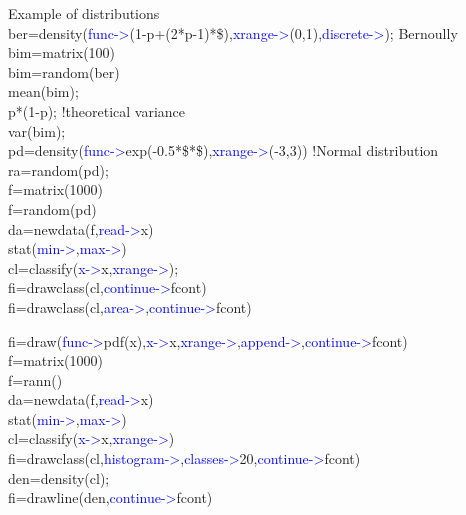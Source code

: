 \begin{example}[densityex]Example of distributions\\
\label{densityex}
ber=\textcolor{VioletRed}{density}(\textcolor{blue}{func->}(1-p+(2*p-1)*\$),\textcolor{blue}{xrange->}(0,1),\textcolor{blue}{discrete->}); Bernoully\\
bim=\textcolor{VioletRed}{matrix}(100)\\
bim=\textcolor{VioletRed}{random}(ber)\\
\textcolor{VioletRed}{mean}(bim);\\
p*(1-p);  !theoretical variance\\
\textcolor{VioletRed}{var}(bim);\\
pd=\textcolor{VioletRed}{density}(\textcolor{blue}{func->}\textcolor{VioletRed}{exp}(-0.5*\$*\$),\textcolor{blue}{xrange->}(-3,3))  !Normal distribution
ra=\textcolor{VioletRed}{random}(pd);\\
f=\textcolor{VioletRed}{matrix}(1000)\\
f=\textcolor{VioletRed}{random}(pd)\\
da=\textcolor{VioletRed}{newdata}(f,\textcolor{blue}{read->}x)\\
\textcolor{VioletRed}{stat}(\textcolor{blue}{min->},\textcolor{blue}{max->})\\
cl=\textcolor{VioletRed}{classify}(\textcolor{blue}{x->}x,\textcolor{blue}{xrange->});\\
fi=\textcolor{VioletRed}{drawclass}(cl,\textcolor{blue}{continue->}fcont)\\
fi=\textcolor{VioletRed}{drawclass}(cl,\textcolor{blue}{area->},\textcolor{blue}{continue->}fcont)

fi=\textcolor{VioletRed}{draw}(\textcolor{blue}{func->}\textcolor{VioletRed}{pdf}(x),\textcolor{blue}{x->}x,\textcolor{blue}{xrange->},\textcolor{blue}{append->},\textcolor{blue}{continue->}fcont)\\
f=\textcolor{VioletRed}{matrix}(1000)\\
f=\textcolor{VioletRed}{rann}()\\
da=\textcolor{VioletRed}{newdata}(f,\textcolor{blue}{read->}x)\\
\textcolor{VioletRed}{stat}(\textcolor{blue}{min->},\textcolor{blue}{max->})\\
cl=\textcolor{VioletRed}{classify}(\textcolor{blue}{x->}x,\textcolor{blue}{xrange->})\\
fi=\textcolor{VioletRed}{drawclass}(cl,\textcolor{blue}{histogram->},\textcolor{blue}{classes->}20,\textcolor{blue}{continue->}fcont)\\
den=\textcolor{VioletRed}{density}(cl);\\
fi=\textcolor{VioletRed}{drawline}(den,\textcolor{blue}{continue->}fcont)
\end{example}
